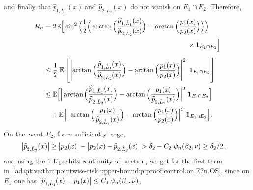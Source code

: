 \documentclass[11pt,a4paper,openany]{article}
\def\E{\mathbb{E}}
\begin{document}
and finally that $ \widehat{p}_{1, \hat L_1}(x)$ and $ \widehat{p}_{2, \hat L_2}(x)$ do not vanish on $E_1 \cap E_2$.
Therefore,
\begin{align}	
	R_n= & \hspace{0.1cm} 2 \hspace{0.02cm}  \E \Big [ \sin^2 \Big ( \frac{ 1}{ 2}  \Big (   \arctan \Big( \dfrac{ \widehat{p}_{1, \hat L_1}(x)}{ \widehat{p}_{2, \hat L_2}(x)}  \Big)  -  \arctan \Big( \dfrac{p_{1}(x)}{p_{2}(x)} \Big) \Big ) \Big)   \nonumber  
	\\
	& \hspace{7cm} \times    \mathbf{1}_{ E_1 \cap E_2 } \Big]    
	\nonumber 
	\\[0.2cm] 
	\leq & \hspace{0.1cm} \frac{ 1}{2}  \hspace{0.1cm} \E \left [  \left |     \arctan \Big( \dfrac{ \widehat{p}_{1, \hat L_1}(x)}{ \widehat{p}_{2, \hat L_2}(x)}  \Big)  -  \arctan \Big( \dfrac{p_{1}(x)}{p_{2}(x)} \Big)  \right |^2  \hspace{0.1cm}    \mathbf{1}_{E_1 \cap E_2} \right]    
	\nonumber  
	\\
	\leq& \hspace{0.1cm} \E  \Big[ \Big| \arctan \Big( \dfrac{ \widehat{p}_{1, \hat L_1}(x)}{ \widehat{p}_{2, \hat L_2}(x)}  \Big)  -  \arctan \Big( \dfrac{p_{1}(x)}{ \widehat{p}_{2, \hat L_2}(x)} \Big) \Big|^{2}    \hspace{0.1cm}    \mathbf{1}_{E_1 \cap   {E}_{2 }} \Big]     \label{adaptive:thm:pointwise-risk.upper-bound:p:proof:control.on.E2n.OS}%
	\\
	&+   \E \Big[ \Big| \arctan \Big( \dfrac{p_{1}(x)}{ \widehat{p}_{2, \hat L_2}(x)}  \Big)  -  \arctan \Big( \dfrac{p_{1}(x)}{p_{2}(x)} \Big) \Big|^{2}     \hspace{0.1cm}      \mathbf{1}_{E_1 \cap  E_2 }\Big]  \nonumber.
\end{align}
On the event $E_2$, for $n$ sufficiently large,
\begin{align*}  
\big| \widehat{p}_{2, \hat L_2}(x) \big|  &\geq   \big| p_{2}(x) \big| - \big| p_{2}(x) - \widehat{p}_{2, \hat L_2}(x) \big|  
> \delta_{2} -  C_{2}     \hspace{0.1cm}  \psi_{n}(\beta_{2}, \nu)      
\geq   \delta_{2}/2 \hspace{0.1cm}  ,
\end{align*} 
and using the $1$-Lipschitz continuity of  $\arctan$, we get for the first term in~\eqref{adaptive:thm:pointwise-risk.upper-bound:p:proof:control.on.E2n.OS}, since on $E_1$ one has $\big| \widehat{p}_{1, \hat L_1}(x) - p_{1}(x) \big|   \leq   C_{1}    \hspace{0.1cm}  \psi_{n}(\beta_{1}, \nu) $,  
\end{document}
